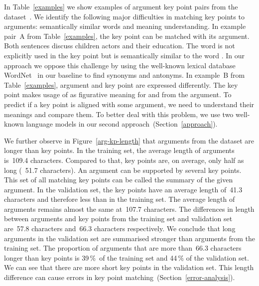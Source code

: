 In Table~\ref{examples} we show examples of argument key point pairs from the \ArgKP dataset~\cite{Bar-HaimEFKLS2020}. 
We identify the following major difficulties in matching key points to arguments: semantically similar words and meaning 
understanding.
In example pair~A from Table~\ref{examples}, the key point can be matched with its argument. Both sentences discuss 
children actors and their education. The word  is not explicitly used in the key point but is 
semantically similar to the word . 
In our approach we oppose this challenge by using the well-known lexical database WordNet~\cite{Miller1995} in our 
baseline to find synonyms and antonyms.
In example~B from Table~\ref{examples}, argument and key point are expressed differently. 
The key point makes usage of  as figurative meaning for  and  from the argument. 
To predict if a key point is aligned with some argument, we need to understand their meanings and compare them. 
To better deal with this problem, we use two well-known language models in our second approach~(Section~\ref{approach}). 

We further observe in Figure~\ref{arg-kp-length} that arguments from the \ArgKP dataset are longer than key points.
In the training set, the average length of arguments is~109.4 characters. 
Compared to that, key points are, on average, only half as long (~51.7 characters).
An argument can be supported by several key points. 
This set of all matching key points can be called the summary of the given argument.  
In the validation set, the key points have an average length of~41.3 characters and therefore less than in the training set. 
The average length of arguments remains almost the same at~107.7 characters. 
The differences in length between arguments and key points from the training set and validation set are~57.8 characters and~66.3 characters respectively. 
We conclude that long arguments in the validation set are summarised stronger than arguments from the training set. 
The proportion of arguments that are more than~66.3 characters longer than key points is 39\,\%~of the training set 
and 44\,\% of the validation set. 
We can see that there are more short key points in the validation set. 
This length difference can cause errors in key point matching~(Section~\ref{error-analysis}).
